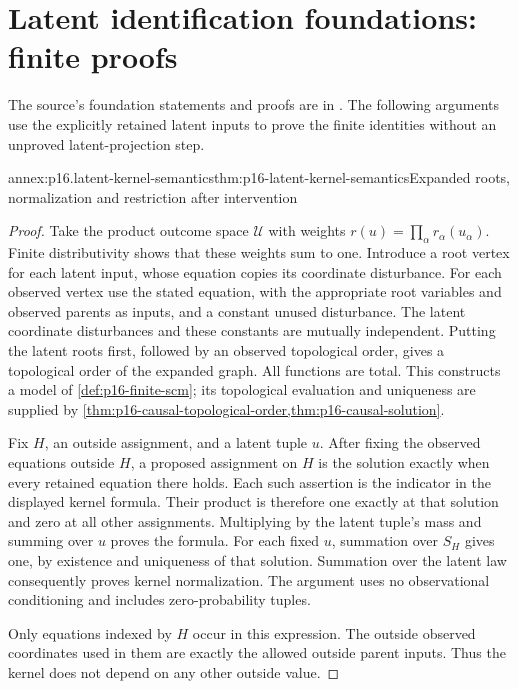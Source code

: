 \section{Latent identification foundations: finite proofs}
\label{sec:annex-p16-latent-identification-foundations}

The source's foundation statements and proofs are in
\cite[Definition~3 and Lemmas~4--8, pp.~1221, 1224]{ShpitserPearl2006JointIdentification}.
The following arguments use the explicitly retained latent inputs to
prove the finite identities without an unproved latent-projection step.

\begin{annexitem}{annex:p16.latent-kernel-semantics}{thm:p16-latent-kernel-semantics}{Expanded roots, normalization and restriction after intervention}
\begin{proof}
Take the product outcome space \(\mathcal U\) with weights
\(r(u)=\prod_\alpha r_\alpha(u_\alpha)\). Finite distributivity
shows that these weights sum to one. Introduce a root vertex for
each latent input, whose equation copies its coordinate disturbance.
For each observed vertex use the stated equation, with the appropriate
root variables and observed parents as inputs, and a constant unused
disturbance. The latent coordinate disturbances and these constants
are mutually independent. Putting the latent roots first, followed
by an observed topological order, gives a topological order of the
expanded graph. All functions are total. This constructs a model of
\cref{def:p16-finite-scm}; its topological evaluation and uniqueness
are supplied by \cref{thm:p16-causal-topological-order,thm:p16-causal-solution}.

Fix \(H\), an outside assignment, and a latent tuple \(u\).
After fixing the observed equations outside \(H\), a proposed
assignment on \(H\) is the solution exactly when every retained
equation there holds. Each such assertion is the indicator in the
displayed kernel formula. Their product is therefore one exactly at
that solution and zero at all other assignments. Multiplying by the
latent tuple's mass and summing over \(u\) proves the formula.
For each fixed \(u\), summation over \(S_H\) gives one, by
existence and uniqueness of that solution. Summation over the latent
law consequently proves kernel normalization. The argument uses no
observational conditioning and includes zero-probability tuples.

Only equations indexed by \(H\) occur in this expression. The
outside observed coordinates used in them are exactly the allowed
outside parent inputs. Thus the kernel does not depend on any other
outside value.


\end{proof}
\end{annexitem}

